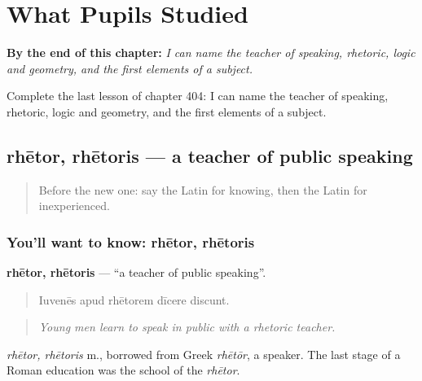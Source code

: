 
\chapter{What Pupils Studied}
\label{ch:la-what-pupils-studied}

\begin{chapteropening}
\textbf{By the end of this chapter:} \emph{I can name the teacher of speaking, rhetoric, logic and geometry, and the first elements of a subject.}

Complete the last lesson of chapter 404: I can name the teacher of speaking, rhetoric, logic and geometry, and the first elements of a subject.
\end{chapteropening}

\section[rhētor, rhētoris]{rhētor, rhētoris — a teacher of public speaking}

\label{lesson:LA-C404-rhetor}



\begin{quote}
Before the new one: say the Latin for knowing, then the Latin for inexperienced.
\end{quote}

\subsection*{You'll want to know: rhētor, rhētoris}
\textbf{rhētor, rhētoris} — \textquotedblleft{}a teacher of public speaking\textquotedblright{}.

\begin{quote}
Iuvenēs apud rhētorem dīcere discunt.
\end{quote}

\begin{quote}
\emph{Young men learn to speak in public with a rhetoric teacher.}
\end{quote}

\emph{rhētor, rhētoris} m., borrowed from Greek \emph{rhētōr}, a speaker. The last stage of a Roman education was the school of the \emph{rhētor}.

